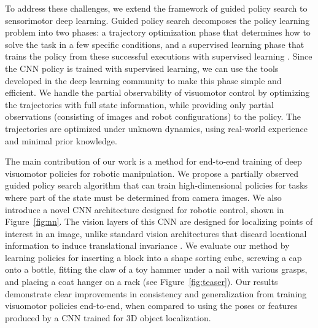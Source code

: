 \documentclass[final]{IEEEtran}
\begin{document}
To address these challenges, we extend the framework of guided policy search to sensorimotor deep learning. Guided policy search decomposes the policy learning problem into two phases: a trajectory optimization phase that determines how to solve the task in a few specific conditions, and a supervised learning phase that trains the policy from these successful executions with supervised learning \cite{lk-lcnnp-14}. Since the CNN policy is trained with supervised learning, we can use the tools developed in the deep learning community to make this phase simple and efficient. We handle the partial observability of visuomotor control by optimizing the trajectories with full state information, while providing only partial observations (consisting of images and robot configurations) to the policy. The trajectories are optimized under unknown dynamics, using real-world experience and minimal prior knowledge.


The main contribution of our work is a method for end-to-end training of deep visuomotor policies for robotic manipulation. We propose a partially observed guided policy search algorithm that can train high-dimensional policies for tasks where part of the state must be determined from camera images.
We also introduce a novel CNN architecture designed for robotic control, shown in Figure~\ref{fig:nn}. The vision layers of this CNN are designed for localizing points of interest in an image, unlike standard vision architectures that discard locational information to induce translational invariance \cite{ksh-incdc-12}. We evaluate our method by learning policies for inserting a block into a shape sorting cube, screwing a cap onto a bottle, fitting the claw of a toy hammer under a nail with various grasps, and placing a coat hanger on a rack (see Figure~\ref{fig:teaser}). Our results demonstrate clear improvements in consistency and generalization from training visuomotor policies end-to-end, when compared to using the poses or features produced by a CNN trained for 3D object localization.
\end{document}
